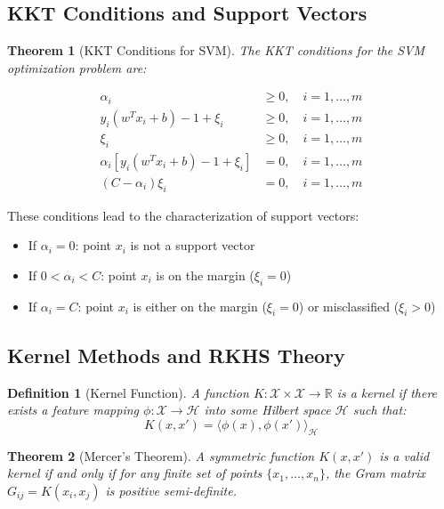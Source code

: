 \documentclass[12pt, a4paper]{article}
\newtheorem{theorem}{Theorem}
\newtheorem{definition}{Definition}
\begin{document}
\subsection{KKT Conditions and Support Vectors}

\begin{theorem}[KKT Conditions for SVM]
The KKT conditions for the SVM optimization problem are:

\begin{align}
\alpha_i &\geq 0, \quad i = 1, \ldots, m \\
y_i(w^Tx_i + b) - 1 + \xi_i &\geq 0, \quad i = 1, \ldots, m \\
\xi_i &\geq 0, \quad i = 1, \ldots, m \\
\alpha_i[y_i(w^Tx_i + b) - 1 + \xi_i] &= 0, \quad i = 1, \ldots, m \\
(C - \alpha_i)\xi_i &= 0, \quad i = 1, \ldots, m
\end{align}
\end{theorem}

These conditions lead to the characterization of support vectors:
\begin{itemize}
\item If $\alpha_i = 0$: point $x_i$ is not a support vector
\item If $0 < \alpha_i < C$: point $x_i$ is on the margin ($\xi_i = 0$)
\item If $\alpha_i = C$: point $x_i$ is either on the margin ($\xi_i = 0$) or misclassified ($\xi_i > 0$)
\end{itemize}

\subsection{Kernel Methods and RKHS Theory}

\begin{definition}[Kernel Function]
A function $K: \mathcal{X} \times \mathcal{X} \to \mathbb{R}$ is a kernel if there exists a feature mapping $\phi: \mathcal{X} \to \mathcal{H}$ into some Hilbert space $\mathcal{H}$ such that:
\begin{equation}
K(x, x') = \langle \phi(x), \phi(x') \rangle_{\mathcal{H}}
\end{equation}
\end{definition}

\begin{theorem}[Mercer's Theorem]
A symmetric function $K(x, x')$ is a valid kernel if and only if for any finite set of points $\{x_1, \ldots, x_n\}$, the Gram matrix $G_{ij} = K(x_i, x_j)$ is positive semi-definite.
\end{theorem}
\end{document}
